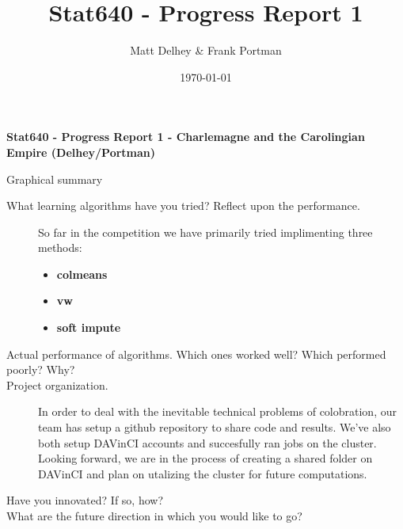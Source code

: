 \documentclass[oneside]{article}
\title{Stat640 - Progress Report 1}
\author{Matt Delhey \& Frank Portman}
\date{\today}
\begin{document}
\begin{center}
\textbf{Stat640 - Progress Report 1 - Charlemagne and the Carolingian Empire (Delhey/Portman)}
\end{center}

Graphical summary

\begin{description}
\item[What learning algorithms have you tried? Reflect upon the performance.] So far in the competition we have primarily tried implimenting three methods:
  \begin{itemize}
  \item \textbf{colmeans}
  \item \textbf{vw}
  \item \textbf{soft impute}
  \end{itemize}

\item[Actual performance of algorithms. Which ones worked well? Which performed poorly? Why?]

\item[Project organization.] In order to deal with the inevitable technical problems of colobration, our team has setup a github repository to share code and results. We've also both setup DAVinCI accounts and succesfully ran jobs on the cluster. Looking forward, we are in the process of creating a shared folder on DAVinCI and plan on utalizing the cluster for future computations.

\item[Have you innovated? If so, how?]

\item[What are the future direction in which you would like to go?]
\end{description}
\end{document}
